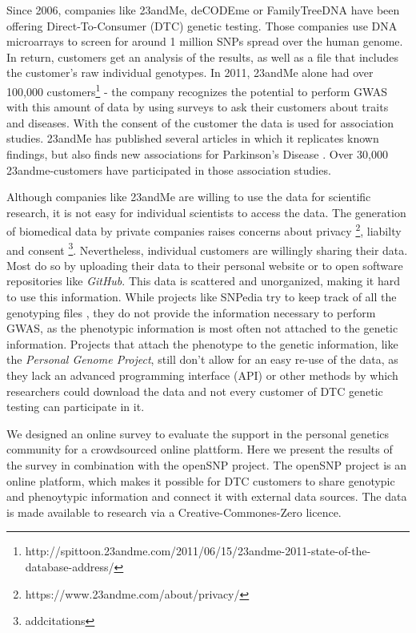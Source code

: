 \documentclass[10pt]{article}
\begin{document}
Since 2006, companies like 23andMe, deCODEme or FamilyTreeDNA have been offering Direct-To-Consumer (DTC) genetic testing. 
Those companies use DNA microarrays to screen for around 1 million SNPs spread over the human genome. In return, customers 
get an analysis of the results, as well as a file that includes the customer's raw individual genotypes. In 2011, 23andMe 
alone had over 100,000 customers\footnote{http://spittoon.23andme.com/2011/06/15/23andme-2011-state-of-the-database-address/} 
- the company recognizes the potential to perform GWAS with this amount of data by using surveys to ask their customers about 
traits and diseases. With the consent of the customer the data is used for association studies. 23andMe has published several 
articles in which it replicates known findings, but also finds new associations for Parkinson's Disease \cite{Eriksson2010, Do2011}. 
Over 30,000 23andme-customers have participated in those association studies.  

Although companies like 23andMe are willing to use the data for scientific research,
it is not easy for individual scientists to access the data. 
The generation of biomedical data by private companies raises concerns about privacy \footnote{https://www.23andme.com/about/privacy/}, 
liabilty and consent \footnote{addcitations}. 
Nevertheless, individual customers are willingly sharing their data. Most do so by uploading their data to
their personal website or to open software repositories like \textit{GitHub}. 
This data is scattered and unorganized, making it hard to use this information. While projects like SNPedia try to keep track of all 
the genotyping files \cite{Cariaso2011}, they do not provide the information necessary to perform GWAS, as the phenotypic information is 
most often not attached to the genetic information. Projects that attach the phenotype to the genetic information, 
like the \textit{Personal Genome Project}, still don't allow for an easy re-use of the data, as they lack an advanced programming interface (API) 
or other methods by which researchers could download the data and not every customer of DTC genetic testing can participate in it.  

We designed an online survey to evaluate the support in the personal genetics community for a crowdsourced online plattform. Here we present the results of the survey in combination with the openSNP project. 
The openSNP project is an online platform, which makes it possible for DTC customers to share genotypic and phenoytypic information and connect it with external data sources. 
The data is made available to research via a Creative-Commones-Zero licence.
\end{document}
